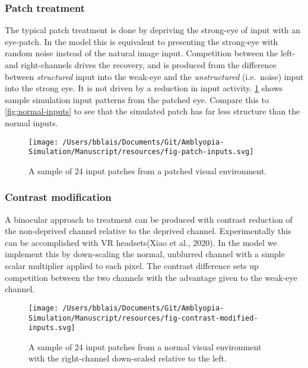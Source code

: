 \documentclass[
  onecolumn]{article}
\begin{document}
\hypertarget{patch-treatment}{%
\subsubsection{Patch treatment}\label{patch-treatment}}

The typical patch treatment is done by depriving the strong-eye of input
with an eye-patch. In the model this is equivalent to presenting the
strong-eye with random noise instead of the natural image input.
Competition between the left- and right-channels drives the recovery,
and is produced from the difference between \emph{structured} input into
the weak-eye and the \emph{unstructured} (i.e.~noise) input into the
strong eye. It is not driven by a reduction in input activity.
\ref{fig:patch-inputs} shows sample simulation input patterns from the
patched eye. Compare this to \ref{fig:normal-inputs} to see that the
simulated patch has far less structure than the normal inputs.

\begin{figure}
\hypertarget{fig:patch-inputs}{%
\centering
\texttt{[image: /Users/bblais/Documents/Git/Amblyopia-Simulation/Manuscript/resources/fig-patch-inputs.svg]}
\caption{A sample of 24 input patches from a patched visual
environment.}\label{fig:patch-inputs}
}
\end{figure}

\hypertarget{contrast-modification}{%
\subsubsection{Contrast modification}\label{contrast-modification}}

A binocular approach to treatment can be produced with contrast
reduction of the non-deprived channel relative to the deprived channel.
Experimentally this can be accomplished with VR headsets(Xiao et al.,
2020). In the model we implement this by down-scaling the normal,
unblurred channel with a simple scalar multiplier applied to each pixel.
The contrast difference sets up competition between the two channels
with the advantage given to the weak-eye channel.

\begin{figure}
\hypertarget{fig:contrast-modified-inputs}{%
\centering
\texttt{[image: /Users/bblais/Documents/Git/Amblyopia-Simulation/Manuscript/resources/fig-contrast-modified-inputs.svg]}
\caption{A sample of 24 input patches from a normal visual environment
with the right-channel down-scaled relative to the
left.}\label{fig:contrast-modified-inputs}
}
\end{figure}
\end{document}
